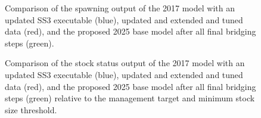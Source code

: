 \documentclass[
]{scrartcl}
\begin{document}
\begin{figure}


\caption{\label{fig-bridge19-comp2}Comparison of the spawning output of
the 2017 model with an updated SS3 executable (blue), updated and
extended and tuned data (red), and the proposed 2025 base model after
all final bridging steps (green).}

\end{figure}%

\begin{figure}


\caption{\label{fig-bridge19-comp4}Comparison of the stock status output
of the 2017 model with an updated SS3 executable (blue), updated and
extended and tuned data (red), and the proposed 2025 base model after
all final bridging steps (green) relative to the management target and
minimum stock size threshold.}

\end{figure}%
\end{document}
